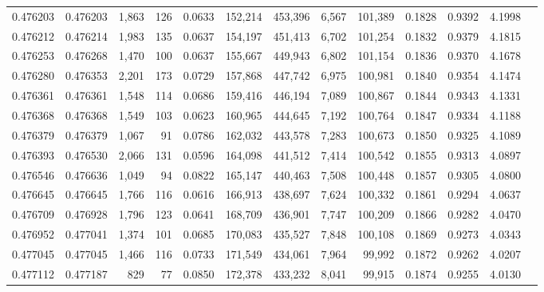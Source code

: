 \begin{tabular}{rrrrrrrrrrrrr}
0.476203 & 0.476203 & 1,863 &   126 &                                     0.0633 & 152,214 & 453,396 &   6,567 & 101,389 & 0.1828 & 0.9392 & 4.1998 \\
0.476212 & 0.476214 & 1,983 &   135 &                                     0.0637 & 154,197 & 451,413 &   6,702 & 101,254 & 0.1832 & 0.9379 & 4.1815 \\
0.476253 & 0.476268 & 1,470 &   100 &                                     0.0637 & 155,667 & 449,943 &   6,802 & 101,154 & 0.1836 & 0.9370 & 4.1678 \\
0.476280 & 0.476353 & 2,201 &   173 &                                     0.0729 & 157,868 & 447,742 &   6,975 & 100,981 & 0.1840 & 0.9354 & 4.1474 \\
0.476361 & 0.476361 & 1,548 &   114 &                                     0.0686 & 159,416 & 446,194 &   7,089 & 100,867 & 0.1844 & 0.9343 & 4.1331 \\
0.476368 & 0.476368 & 1,549 &   103 &                                     0.0623 & 160,965 & 444,645 &   7,192 & 100,764 & 0.1847 & 0.9334 & 4.1188 \\
0.476379 & 0.476379 & 1,067 &    91 &                                     0.0786 & 162,032 & 443,578 &   7,283 & 100,673 & 0.1850 & 0.9325 & 4.1089 \\
0.476393 & 0.476530 & 2,066 &   131 &                                     0.0596 & 164,098 & 441,512 &   7,414 & 100,542 & 0.1855 & 0.9313 & 4.0897 \\
0.476546 & 0.476636 & 1,049 &    94 &                                     0.0822 & 165,147 & 440,463 &   7,508 & 100,448 & 0.1857 & 0.9305 & 4.0800 \\
0.476645 & 0.476645 & 1,766 &   116 &                                     0.0616 & 166,913 & 438,697 &   7,624 & 100,332 & 0.1861 & 0.9294 & 4.0637 \\
0.476709 & 0.476928 & 1,796 &   123 &                                     0.0641 & 168,709 & 436,901 &   7,747 & 100,209 & 0.1866 & 0.9282 & 4.0470 \\
0.476952 & 0.477041 & 1,374 &   101 &                                     0.0685 & 170,083 & 435,527 &   7,848 & 100,108 & 0.1869 & 0.9273 & 4.0343 \\
0.477045 & 0.477045 & 1,466 &   116 &                                     0.0733 & 171,549 & 434,061 &   7,964 &  99,992 & 0.1872 & 0.9262 & 4.0207 \\
0.477112 & 0.477187 &   829 &    77 &                                     0.0850 & 172,378 & 433,232 &   8,041 &  99,915 & 0.1874 & 0.9255 & 4.0130 \\

\end{tabular}
